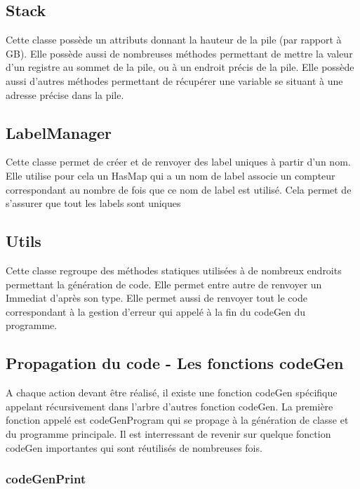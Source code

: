 \documentclass[12pt, a4paper, one side]{article}
\begin{document}
\subsection{Stack}

Cette classe possède un attributs donnant la hauteur de la pile (par rapport à GB). Elle possède aussi
de nombreuses méthodes permettant de mettre la valeur d'un registre au sommet de la pile, ou à un
endroit précis de la pile. Elle possède aussi d'autres méthodes permettant de récupérer une variable
se situant à une adresse précise dans la pile.

\subsection{LabelManager}

Cette classe permet de créer et de renvoyer des label uniques à partir d'un nom. Elle utilise pour cela un HasMap
qui a un nom de label associe un compteur correspondant au nombre de fois que ce nom de label est utilisé. Cela
permet de s'assurer que tout les labels sont uniques

\subsection{Utils}

Cette classe regroupe des méthodes statiques utilisées à de nombreux endroits permettant la génération
de code. Elle permet entre autre de renvoyer un Immediat d'après son type. Elle permet aussi de renvoyer tout
le code correspondant à la gestion d'erreur qui appelé à la fin du codeGen du programme.

\subsection{Propagation du code - Les fonctions codeGen}

A chaque action devant être réalisé, il existe une fonction codeGen spécifique appelant récursivement dans l'arbre
d'autres fonction codeGen. La première fonction appelé est codeGenProgram qui se propage à la génération de classe
et du programme principale. Il est interressant de revenir sur quelque fonction codeGen importantes qui sont réutilisés
de nombreuses fois.
    
\subsubsection{codeGenPrint}
\end{document}
